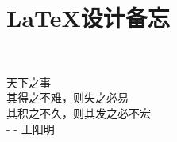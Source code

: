 \chapter{\LaTeX 设计备忘}

\thispagestyle{fancy}
\fancyhead[ER]{\song\wuhao\leftmark}\fancyhead[OL]{\song\wuhao\rightmark}
\fancyhead[EL]{\song\wuhao\rightmark}\fancyhead[OR]{\song\wuhao\leftmark}



~\\[9cm]
\begin{flushright}
\kai\xiaosi
\textcolor[rgb]{0.00,0.50,0.00}{
天下之事\\
其得之不难，则失之必易\\
其积之不久，则其发之必不宏\\
- - 王阳明}
\end{flushright}


















